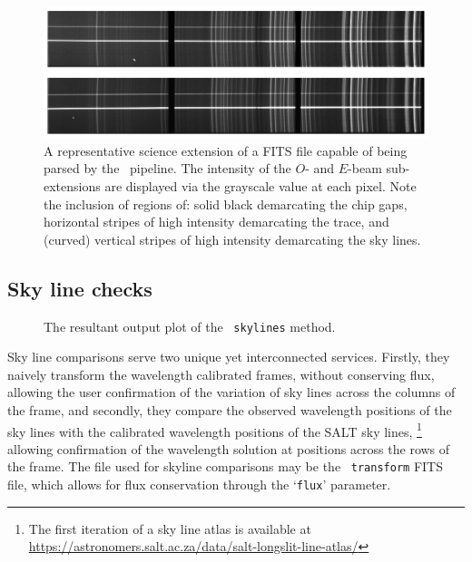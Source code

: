 \begin{figure}[t]
    \centering
    \includegraphics[width = 1.0\textwidth]{figures/3_post_wav_cal.pdf}
    \caption{A representative science extension of a \gls{FITS} file capable of being parsed by the \polsalt\ pipeline. The intensity of the $O$- and $E$-beam sub-extensions are displayed via the grayscale value at each pixel. Note the inclusion of regions of: solid black demarcating the chip gaps, horizontal stripes of high intensity demarcating the trace, and (curved) vertical stripes of high intensity demarcating the sky lines.}
    \label{fig:polsalt_post_wav_cal}
\end{figure}

\subsection{Sky line checks}\label{subsec:stops_skyline}



\begin{figure}[t]
    \centering
    \caption{The resultant output plot of the \stops\ \texttt{skylines} method.}
    \label{fig:stops_sky_eg}
\end{figure}

Sky line comparisons serve two unique yet interconnected services. Firstly, they naively transform the wavelength calibrated frames, without conserving flux, allowing the user confirmation of the variation of sky lines across the columns of the frame, and secondly, they compare the observed wavelength positions of the sky lines with the calibrated wavelength positions of the \gls{SALT} sky lines,%
\footnote{The first iteration of a sky line atlas is available at \url{https://astronomers.salt.ac.za/data/salt-longslit-line-atlas/}}
allowing confirmation of the wavelength solution at positions across the rows of the frame. The file used for skyline comparisons may be the \iraf\ \texttt{transform} \gls{FITS} file, which allows for flux conservation through the `\texttt{flux}' parameter.

